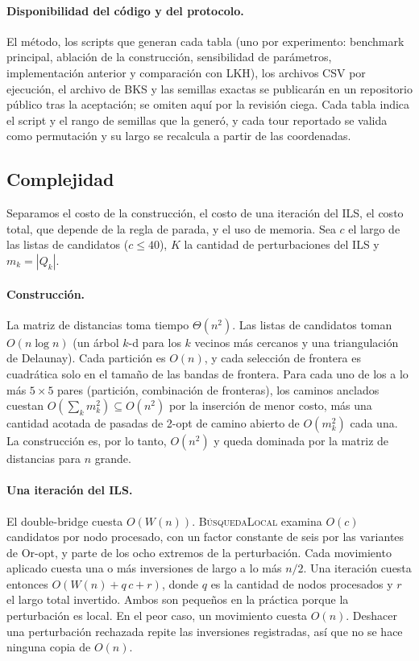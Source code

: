 \documentclass[runningheads]{llncs}
\begin{document}
\paragraph{Disponibilidad del código y del protocolo.} El método, los
scripts que generan cada tabla (uno por experimento: benchmark principal,
ablación de la construcción, sensibilidad de parámetros, implementación
anterior y comparación con LKH), los archivos CSV por ejecución, el
archivo de BKS y las semillas exactas se publicarán en un repositorio
público tras la aceptación; se omiten aquí por la revisión ciega. Cada
tabla indica el script y el rango de semillas que la generó, y cada tour
reportado se valida como permutación y su largo se recalcula a partir de
las coordenadas.

\subsection{Complejidad}
\label{sec:complexity}

Separamos el costo de la construcción, el costo de una iteración del
ILS, el costo total, que depende de la regla de parada, y el uso de
memoria. Sea $c$ el largo de las listas de candidatos ($c\le 40$), $K$ la
cantidad de perturbaciones del ILS y $m_k=|Q_k|$.

\paragraph{Construcción.} La matriz de distancias toma tiempo
$\Theta(n^2)$. Las listas de candidatos toman $O(n\log n)$ (un árbol
$k$-d para los $k$ vecinos más cercanos y una triangulación de
Delaunay). Cada partición es $O(n)$, y cada selección de frontera es
cuadrática solo en el tamaño de las bandas de frontera. Para cada uno de
los a lo más $5\times5$ pares (partición, combinación de fronteras), los
caminos anclados cuestan $O(\sum_k m_k^2)\subseteq O(n^2)$ por la
inserción de menor costo, más una cantidad acotada de pasadas de 2-opt
de camino abierto de $O(m_k^2)$ cada una. La construcción es, por lo
tanto, $O(n^2)$ y queda dominada por la matriz de distancias para $n$
grande.

\paragraph{Una iteración del ILS.} El double-bridge cuesta $O(W(n))$.
\textsc{BúsquedaLocal} examina $O(c)$ candidatos por nodo procesado, con
un factor constante de seis por las variantes de Or-opt, y parte de los
ocho extremos de la perturbación. Cada movimiento aplicado cuesta una o
más inversiones de largo a lo más $n/2$. Una iteración cuesta entonces
$O(W(n)+q\,c+r)$, donde $q$ es la cantidad de nodos procesados y $r$ el
largo total invertido. Ambos son pequeños en la práctica porque la
perturbación es local. En el peor caso, un movimiento cuesta $O(n)$.
Deshacer una perturbación rechazada repite las inversiones registradas,
así que no se hace ninguna copia de $O(n)$.
\end{document}
